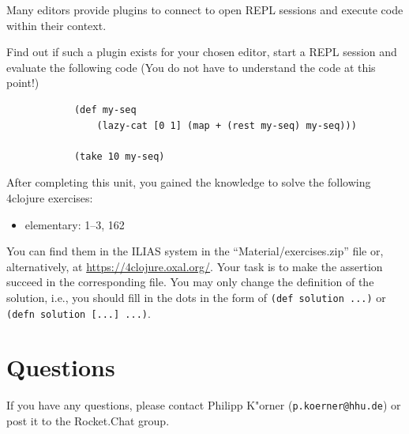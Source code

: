 \documentclass[11pt,a4paper]{article}
\begin{document}
	\begin{exercise}
		Many editors provide plugins
		to connect to open REPL sessions
		and execute code within their context.
		
		Find out if such a plugin exists for your chosen editor,
		start a REPL session and evaluate the following
		code (You do not have to understand the code at this point!)
		
		\begin{verbatim}
			(def my-seq
			    (lazy-cat [0 1] (map + (rest my-seq) my-seq)))
			
			(take 10 my-seq)
		\end{verbatim}
	\end{exercise}

    \begin{exercise}
        After completing this unit, you gained the knowledge to solve the following 4clojure exercises:

        \begin{itemize}
            \item elementary: 1--3, 162
        \end{itemize}

        \noindent You can find them in the ILIAS system in the ``Material/exercises.zip'' file or, alternatively,
        at \url{https://4clojure.oxal.org/}.
        Your task is to make the assertion succeed in the corresponding file.
        You may only change the definition of the solution, i.e., you should fill in the dots in the form of \verb|(def solution ...)| or \verb|(defn solution [...] ...)|.
    \end{exercise}
	
	
    \enlargethispage{2\baselineskip}
	\section*{Questions}
	If you have any questions, please contact Philipp K"orner (\texttt{p.koerner@hhu.de}) or post it to the Rocket.Chat group.
\end{document}
